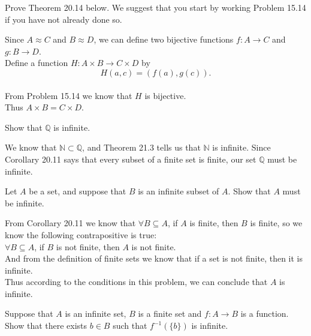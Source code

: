 \documentclass[11pt, a4paper, UTF8]{ctexart}
\begin{document}
\begin{problem}[UD: 20.10]
  Prove Theorem 20.14 below. We suggest that you start by working Problem 15.14 
  if you have not already done so.
\end{problem}

\begin{solution}
  Since $A \approx C$ and $B \approx D$, we can define two bijective functions $f: A \rightarrow C$ and $g: B \rightarrow D$.\\
  Define a function $H: A \times B \rightarrow C \times D$ by 
  $$H(a, c) = (f(a), g(c)).$$\\
  From Problem 15.14 we know that $H$ is bijective.\\
  Thus $A \times B = C \times D$.
\end{solution}

\begin{problem}[UD: 21.7]
  Show that $\mathbb{Q}$ is infinite.
\end{problem}

\begin{solution}
  We know that $\mathbb{N} \subset \mathbb{Q}$, and Theorem 21.3 tells 
  us that $\mathbb{N}$ is infinite. Since Corollary 20.11 says that 
  every subset of a finite set is finite, our set $\mathbb{Q}$ must be 
  infinite.
\end{solution}

\begin{problem}[UD: 21.9]
  Let $A$ be a set, and suppose that $B$ is an infinite subset of $A$. 
  Show that $A$ must be infinite.
\end{problem}

\begin{solution}
  From Corollary 20.11 we know that $\forall B \subseteq A$, if 
  $A$ is finite, then $B$ is finite, so we know the following 
  contrapositive is true:\\
  $\forall B \subseteq A$, if $B$ is not finite, then $A$ is not finite.\\
  And from the definition of finite sets we know that if a set is 
  not finite, then it is infinite.\\
  Thus according to the conditions in this problem, we can conclude 
  that $A$ is infinite.
\end{solution}

\begin{problem}[UD: 21.10]
  Suppose that $A$ is an infinite set, $B$ is a finite set and $f: A \rightarrow B$ 
  is a function. Show that there exists $b \in B$ such that $f^{-1}(\{ b \})$ 
  is infinite.
\end{problem}
\end{document}
